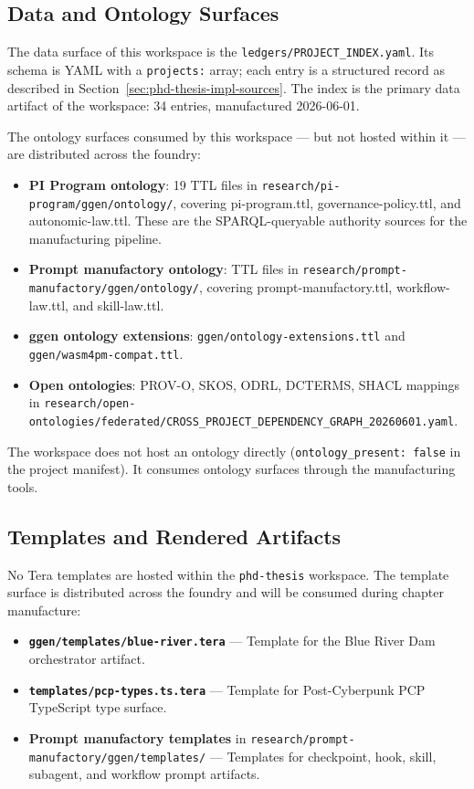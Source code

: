 \subsection{Data and Ontology Surfaces}
\label{sec:phd-thesis-impl-data}

The data surface of this workspace is the \texttt{ledgers/PROJECT\_INDEX.yaml}. Its schema
is YAML with a \texttt{projects:} array; each entry is a structured record as described in
Section~\ref{sec:phd-thesis-impl-sources}. The index is the primary data artifact of the
workspace: 34 entries, manufactured 2026-06-01.

The ontology surfaces consumed by this workspace --- but not hosted within it --- are
distributed across the foundry:

\begin{itemize}
  \item \textbf{PI Program ontology}: 19 TTL files in
    \texttt{research/pi-program/ggen/ontology/}, covering pi-program.ttl,
    governance-policy.ttl, and autonomic-law.ttl. These are the SPARQL-queryable authority
    sources for the manufacturing pipeline.
  \item \textbf{Prompt manufactory ontology}: TTL files in
    \texttt{research/prompt-manufactory/ggen/ontology/}, covering prompt-manufactory.ttl,
    workflow-law.ttl, and skill-law.ttl.
  \item \textbf{ggen ontology extensions}: \texttt{ggen/ontology-extensions.ttl} and
    \texttt{ggen/wasm4pm-compat.ttl}.
  \item \textbf{Open ontologies}: PROV-O, SKOS, ODRL, DCTERMS, SHACL mappings in
    \texttt{research/open-ontologies/federated/CROSS\_PROJECT\_DEPENDENCY\_GRAPH\_20260601.yaml}.
\end{itemize}

The workspace does not host an ontology directly (\texttt{ontology\_present: false} in the
project manifest). It consumes ontology surfaces through the manufacturing tools.

\subsection{Templates and Rendered Artifacts}
\label{sec:phd-thesis-impl-templates}

No Tera templates are hosted within the \texttt{phd-thesis} workspace. The template surface
is distributed across the foundry and will be consumed during chapter manufacture:

\begin{itemize}
  \item \textbf{\texttt{ggen/templates/blue-river.tera}} --- Template for the Blue River Dam
    orchestrator artifact.
  \item \textbf{\texttt{templates/pcp-types.ts.tera}} --- Template for Post-Cyberpunk PCP
    TypeScript type surface.
  \item \textbf{Prompt manufactory templates} in
    \texttt{research/prompt-manufactory/ggen/templates/} --- Templates for checkpoint,
    hook, skill, subagent, and workflow prompt artifacts.
\end{itemize}


